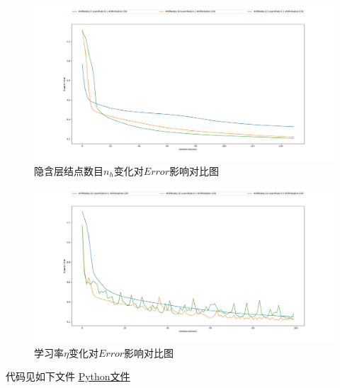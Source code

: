 \documentclass[a4paper,11pt,onecolumn,oneside,UTF8]{article}
\begin{document}
\begin{figure}[H]
    \centering
    \includegraphics[width=\textwidth]{hw4_1.png}
    \caption{ 隐含层结点数目$n_h$变化对$Error$影响对比图 }
    \label{img1}
\end{figure}
\begin{figure}[H]
    \centering
    \includegraphics[width=\textwidth]{hw4_2.png}
    \caption{ 学习率$\eta$变化对$Error$影响对比图 }
    \label{img2}
\end{figure}
代码见如下文件
\href{https://github.com/Allenem/PatternRecognition/blob/main/hw4/hw4.py}{Python文件}
\end{document}
